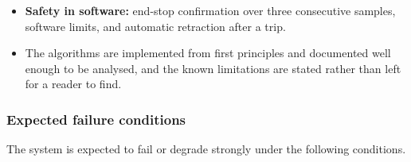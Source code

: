 \begin{itemize}
          \item \textbf{Safety in software:} end-stop confirmation over three consecutive samples, software limits, and automatic retraction after a trip.
          \item The algorithms are implemented from first principles and documented well enough to be analysed, and the known limitations are stated rather than left for a reader to find.
        \end{itemize}

    \subsubsection{Expected failure conditions}
    \label{sec:dis-failure}

        The system is expected to fail or degrade strongly under the following conditions.
